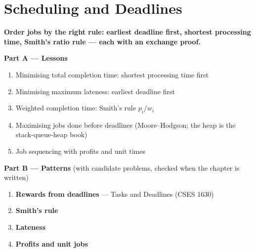 \chapter{Scheduling and Deadlines}
\label{ch:scheduling}

\begin{tcolorbox}[enhanced, colback=white, colframe=secondaryblue, boxrule=1pt, arc=2mm]
\textbf{\large\textcolor{primaryblue}{Order jobs by the right rule: earliest deadline first, shortest processing time, Smith's ratio rule --- each with an exchange proof.}}
\end{tcolorbox}


\begin{plannedbox}
\textbf{Part A --- Lessons}
\begin{enumerate}[leftmargin=*, label=\textbf{A\arabic*.}, itemsep=1pt]
    \item Minimising total completion time: shortest processing time first
    \item Minimising maximum lateness: earliest deadline first
    \item Weighted completion time: Smith's rule $p_i / w_i$
    \item Maximising jobs done before deadlines (Moore--Hodgson; the heap is the stack-queue-heap book)
    \item Job sequencing with profits and unit times
\end{enumerate}
\textbf{Part B --- Patterns} (with candidate problems, checked when the chapter is written)
\begin{enumerate}[leftmargin=*, label=\textbf{P\arabic*.}, itemsep=1pt]
    \item \textbf{Rewards from deadlines} --- Tasks and Deadlines {\small\color{darkgray}(CSES 1630)}
    \item \textbf{Smith's rule}
    \item \textbf{Lateness}
    \item \textbf{Profits and unit jobs}
\end{enumerate}
\end{plannedbox}
